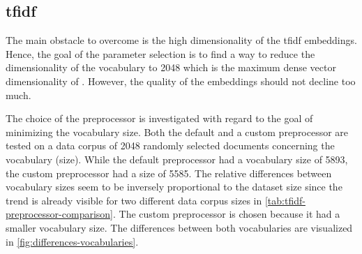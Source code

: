 \subsection*{\acs{tfidf}}\label{subsec:evaluation-tfidf}

The main obstacle to overcome is the high dimensionality of the \ac{tfidf} embeddings.
Hence, the goal of the parameter selection is to find a way to reduce the dimensionality of the vocabulary to 2048 
which is the maximum dense vector dimensionality of \databaseName{}.
However, the quality of the embeddings should not decline too much.

The choice of the preprocessor is investigated with regard to the goal of minimizing the vocabulary size.
Both the default and a custom preprocessor are tested on a data corpus of 2048 randomly selected documents concerning the vocabulary (size).
While the default preprocessor had a vocabulary size of 5893, the custom preprocessor had a size of 5585.
The relative differences between vocabulary sizes seem to be inversely proportional to the dataset size 
since the trend is already visible for two different data corpus sizes in \autoref{tab:tfidf-preprocessor-comparison}.
The custom preprocessor is chosen because it had a smaller vocabulary size.
The differences between both vocabularies are visualized in \autoref{fig:differences-vocabularies}.

